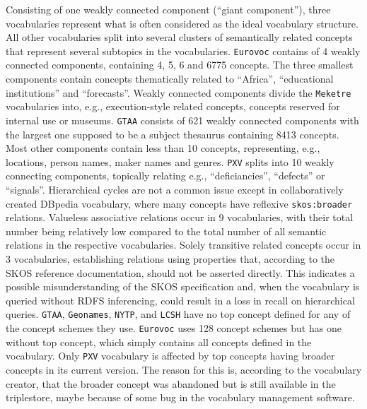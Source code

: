 Consisting of one weakly connected component (``giant component''), three vocabularies represent what is often considered as the ideal vocabulary structure. All other vocabularies split into several clusters of semantically related concepts that represent several subtopics in the vocabularies. \texttt{Eurovoc} contains of 4 weakly connected components, containing 4, 5, 6 and 6775 concepts. The three smallest components contain concepts thematically related to ``Africa'', ``educational institutions'' and ``forecasts''. Weakly connected components divide the \texttt{Meketre} vocabularies into, e.g., execution-style related concepts, concepts reserved for internal use or museums. \texttt{GTAA} consists of 621 weakly connected components with the largest one supposed to be a subject thesaurus containing 8413 concepts. Most  other components contain less than 10 concepts, representing, e.g., locations, person names, maker names and genres. \texttt{PXV} splits into 10 weakly connecting components, topically relating e.g., ``deficiancies'', ``defects'' or ``signals''.
Hierarchical cycles are not a common issue except in collaboratively created DBpedia vocabulary, where many concepts have reflexive \texttt{skos:broader} relations.
Valueless associative relations occur in 9 vocabularies, with their total number being relatively low compared to the total number of all semantic relations in the respective vocabularies.
Solely transitive related concepts occur in 3 vocabularies, establishing relations using properties that, according to the SKOS reference documentation, should not be asserted directly. This indicates a possible misunderstanding of the SKOS specification and, when the vocabulary is queried without RDFS inferencing, could result in a loss in recall on hierarchical queries.
\texttt{GTAA}, \texttt{Geonames}, \texttt{NYTP}, and \texttt{LCSH} have no top concept defined for any of the concept schemes they use. \texttt{Eurovoc} uses 128 concept schemes but has one without top concept, which simply contains all concepts defined in the vocabulary.
Only \texttt{PXV} vocabulary is affected by top concepts having broader concepts in its current version. The reason for this is, according to the vocabulary creator, that the broader concept was abandoned but is still available in the triplestore, maybe because of some bug in the vocabulary management software.

